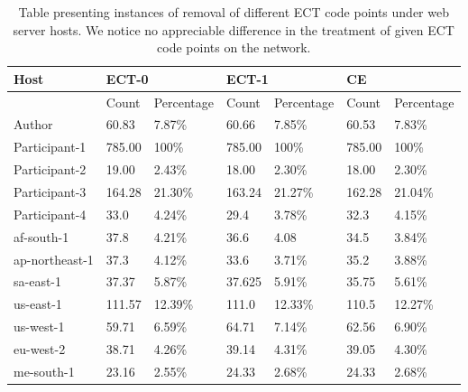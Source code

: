 \documentclass{l4proj}
\begin{document}
\begin{table}[H]
\begin{tabular}{|l|l|l|l|l|l|l|}
\hline
Host           & \multicolumn{2}{l|}{ECT-0} & \multicolumn{2}{l|}{ECT-1} & \multicolumn{2}{l|}{CE} \\ \hline
               & Count      & Percentage    & Count      & Percentage    & Count    & Percentage   \\ \hline
Author         & 60.83      & 7.87\%        & 60.66      & 7.85\%        & 60.53    & 7.83\%       \\ \hline
Participant-1  & 785.00     & 100\%         & 785.00     & 100\%         & 785.00   & 100\%        \\ \hline
Participant-2  & 19.00      & 2.43\%        & 18.00      & 2.30\%        & 18.00    & 2.30\%       \\ \hline
Participant-3  & 164.28     & 21.30\%        & 163.24     & 21.27\%  & 162.28   &   21.04\%          \\ \hline
Participant-4  & 33.0       & 4.24\%    & 29.4       &  3.78\%     & 32.3     &    4.15\%          \\ \hline
af-south-1     & 37.8       & 4.21\%              & 36.6       &  4.08             & 34.5     & 3.84\%             \\ \hline
ap-northeast-1 & 37.3       & 4.12\%              & 33.6       &   3.71\%            & 35.2     &  3.88\%            \\ \hline
sa-east-1      & 37.37      &  5.87\%             & 37.625     &  5.91\%             & 35.75    & 5.61\%             \\ \hline
us-east-1      & 111.57     & 12.39\%              & 111.0      &  12.33\%             & 110.5    &  12.27\%            \\ \hline
us-west-1      & 59.71      &  6.59\%             & 64.71      &    7.14\%           & 62.56    & 6.90\%             \\ \hline
eu-west-2      & 38.71      &  4.26\%             & 39.14      &   4.31\%            & 39.05    &   4.30\%           \\ \hline
me-south-1     & 23.16      &  2.55\%             & 24.33      &    2.68\%           & 24.33    & 2.68\%              \\ \hline
\end{tabular}
\caption{Table presenting instances of removal of different ECT code points under web server hosts. We notice no appreciable difference in the treatment of given ECT code points on the network.}
\label{tab:diffect}
\end{table}
\end{document}
